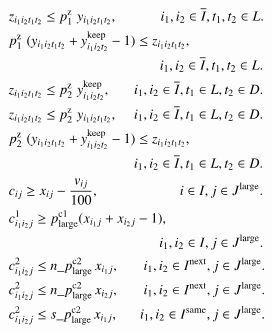 \documentclass[a4j,11pt,twocolumn]{jsarticle}
\begin{document}
\begin{align}
&{z_{i_1i_2t_1t_2}} \leq p_1^{\rm{z}} \hspace{0.3em} {y_{i_1i_2t_1t_2}}, \hspace{3.08em} i_1, i_2 \in \overline{I}, {t_1},{t_2} \in L. \\
&p_1^{\rm{z}} \hspace{0.3em} ({y_{i_1i_2t_1t_2}} + y_{i_1i_2t_2}^{\rm{keep}} - 1) \leq {z_{i_1i_2t_1t_2}}, \notag \\
&\hspace{10.8em}  i_1, i_2 \in \overline{I}, {t_1},{t_2} \in L. \\
&{z_{i_1i_2t_1t_2}} \leq {p_2^{\rm{z}} \hspace{0.3em} y_{i_1i_2t_2}^{\rm{keep}}}, \hspace{1.68em} i_1, i_2 \in \overline{I}, {t_1} \in L , {t_2} \in D. \\
&{z_{i_1i_2t_1t_2}} \leq {p_2^{\rm{z}} \hspace{0.3em} y_{i_1i_2t_1t_2}}, \hspace{1.18em} i_1, i_2 \in \overline{I}, {t_1} \in L , {t_2} \in D. \\
&p_2^{\rm{z}} \hspace{0.3em} ({y_{i_1i_2t_1t_2}} + y_{i_1i_2t_2}^{\rm{keep}} - 1) \leq {z_{i_1i_2t_1t_2}}, \notag \\
&\hspace{8.95em} i_1, i_2 \in \overline{I}, {t_1} \in L , {t_2} \in D. \\
&{c_{ij}} \geq x_{ij} - \frac{v_{ij}} {100}, \hspace{5.78em} i \in I, j \in J^{\rm{large}}. \\
&{c^1_{i_1i_2j}} \geq p_{\rm{large}}^{\rm{c1}} ({x_{i_1j}} + {x_{i_2j}} - 1), \notag \\
&\hspace{10.76em} {i_1},{i_2} \in I, j \in J^{\rm{large}}. \\
&{c^2_{i_1i_2j}} \leq n\_p_{\rm{large}}^{\rm{c2}} \hspace{0.15em}{x_{i_1j}}, \hspace{1.75em} {i_1},{i_2} \in I^{\rm{next}}, j \in J^{\rm{large}}. \\
&{c^2_{i_1i_2j}} \leq n\_p_{\rm{large}}^{\rm{c2}} \hspace{0.15em}{x_{i_2j}}, \hspace{1.75em} {i_1},{i_2} \in I^{\rm{next}}, j \in J^{\rm{large}}. \\
&{c^2_{i_1i_2j}} \leq s\_p_{\rm{large}}^{\rm{c2}} \hspace{0.15em}{x_{i_1j}}, \hspace{1.56em}  {i_1},{i_2} \in I^{\rm{same}}, j \in J^{\rm{large}}. \\

\end{align}
\end{document}
